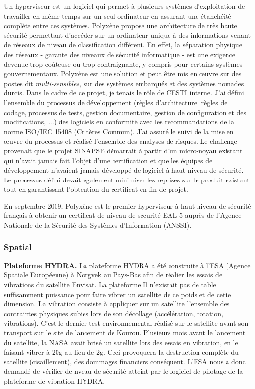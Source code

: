 \documentclass[a4paper,12pt]{article}
\begin{document}
Un hyperviseur est un logiciel qui permet \`a plusieurs syst\`emes d'exploitation de travailler en
m\^eme temps sur un seul ordinateur en assurant une \'etanch\'eit\'e compl\`ete entre ces syst\`emes. 
Polyx\`ene propose une architecture de tr\`es haute s\'ecurit\'e
permettant d'acc\'eder sur un ordinateur unique \`a des informations venant de r\'eseaux de niveau de
classification diff\'erent. En effet, la s\'eparation physique des r\'eseaux - garante des niveaux de
s\'ecurit\'e informatique - est une exigence devenue trop co\^uteuse ou trop contraignante, y compris
pour certains syst\`emes gouvernementaux. Polyx\`ene est une solution et peut \^etre mis en \oe{}uvre sur des postes
dit \emph{multi-sensibles}, sur des syst\`emes embarqu\'es et des syst\`emes nomades durcis. 
Dans le cadre de ce projet, je tenais le r\^ole de CESTI interne. J'ai d\'efini l'ensemble du processus de d\'eveloppement (r\`egles d'architecture, r\`egles de codage, processus de tests, gestion documentaire, gestion de configuration et des modifications, ...) 
des logiciels en conformit\'e avec les recommandations de la norme ISO/IEC 15408 (Crit\`eres Commun). J'ai assur\'e le suivi
de la mise en \oe{}uvre du processus et r\'ealis\'e l'ensemble des analyses de risques.  
Le challenge provenait que le projet SINAPSE d\'emarrait \`a partir d'un micro-noyau existant qui n'avait jamais fait l'objet d'une
certification et que les \'equipes de d\'eveloppement n'avaient jamais d\'evelopp\'e de logiciel \`a haut niveau de s\'ecurit\'e. Le processus d\'efini devait \'egalement minimiser les reprises sur le produit existant tout en garantissant l'obtention du certificat 
en fin de projet.

En septembre 2009, Polyx\`ene est le premier hyperviseur \`a haut niveau de s\'ecurit\'e
fran\c{c}ais \`a obtenir un certificat de niveau de s\'ecurit\'e EAL 5 aupr\`es de l'Agence Nationale de la
S\'ecurit\'e des Syst\`emes d'Information (ANSSI).

\subsubsection{Spatial}
\textbf{Plateforme HYDRA.} La plateforme HYDRA a \'et\'e construite
\`a l'ESA (Agence Spatiale Europ\'eenne) \`a  Norgvek au Pays-Bas afin
de r\'ealier les essais de vibrations du satellite Envisat. La
plateforme  Il n'existait pas de table suffisamment puissance pour
faire vibrer un satellite de ce poids et de cette dimension. La
vibration consiste \`a appliquer sur un satellite l'ensemble des
contraintes physiques subies lors de son d\'ecollage
(acc\'el\'eration, rotation, vibrations). C'est le dernier test
environnemental r\'ealis\'e sur le satellite avant son transport sur
le site de lancement de Kourou. Plusieurs mois avant le lancement du
satellite, la NASA avait bris\'e un satellite lors des essais en
vibration, en le faisant vibrer à 20g au lieu de 2g. Ceci provoquera
la destruction compl\`ete du satellite (cisaillement), des dommages
financiers cons\'equent. L'ESA nous a donc
demand\'e de v\'erifier de nveau de s\'ecurit\'e atteint par le
logiciel de pilotage de la plateforme de vibration HYDRA. 
\end{document}
